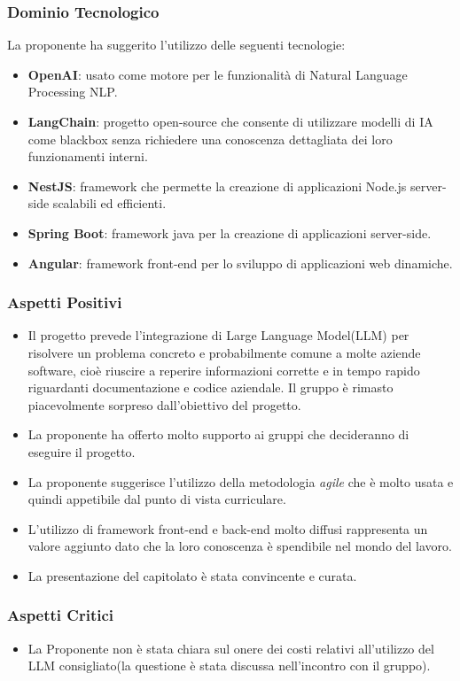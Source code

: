 \documentclass[a4paper, 12pt]{article}
\begin{document}
\subsubsection{Dominio Tecnologico}
La proponente ha suggerito l’utilizzo delle seguenti tecnologie:
\begin{itemize}
    \item \textbf{OpenAI}: usato come motore per le funzionalità di Natural Language Processing NLP.
    \item \textbf{LangChain}: progetto open-source che consente di utilizzare modelli di IA come blackbox senza richiedere una conoscenza dettagliata dei loro funzionamenti interni.
    \item \textbf{NestJS}: framework che permette la creazione di applicazioni Node.js server-side scalabili ed efficienti.
    \item \textbf{Spring Boot}: framework java per la creazione di applicazioni server-side.
    \item \textbf{Angular}: framework front-end per lo sviluppo di applicazioni web dinamiche.
    
\end{itemize}

\subsubsection{Aspetti Positivi}
\begin{itemize}
    \item Il progetto prevede l’integrazione di Large Language Model(LLM) per risolvere un problema concreto e probabilmente comune a molte aziende software, cioè riuscire a reperire informazioni corrette e in tempo rapido riguardanti documentazione e codice aziendale.
    Il gruppo è rimasto piacevolmente sorpreso dall'obiettivo del progetto.
    
    \item La proponente ha offerto molto supporto ai gruppi che decideranno di eseguire il progetto.
    
    \item La proponente suggerisce l’utilizzo della metodologia \textit{agile} che è molto usata e quindi appetibile dal punto di vista curriculare.
    
    \item L’utilizzo di framework front-end e back-end molto diffusi rappresenta un valore aggiunto dato che la loro conoscenza è spendibile nel mondo del lavoro.
    
    \item La presentazione del capitolato è stata convincente e curata.
    
\end{itemize}

\subsubsection{Aspetti Critici}
\begin{itemize}
    \item La Proponente non è stata chiara sul onere dei costi relativi all’utilizzo del LLM consigliato(la questione è stata discussa nell'incontro con il gruppo).
\end{itemize}
\end{document}
